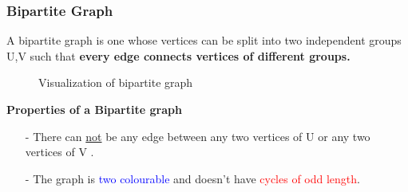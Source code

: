 \documentclass{article}
\begin{document}
\subsubsection{\large Bipartite Graph}
\Large
A bipartite graph is one whose vertices can be split into two independent groups U,V such that \textbf{every edge connects vertices of different groups.} \\
\vspace{10mm}
\begin{figure}[H]
    \centering
    \caption{Visualization of bipartite graph}
\end{figure}
\newpage
\large \textbf{Properties of a Bipartite graph}\\
\Large
\begin{itemize}
    \item[-] There can \underline{not} be any edge between any two vertices of U or any two vertices of V .\\
    \item[-] The graph is \textcolor{blue}{two colourable} and doesn't have \textcolor{red}{cycles of odd length}.
\end{itemize}
\end{document}
